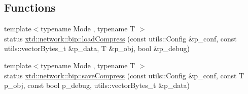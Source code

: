 \subsection*{Functions}
\begin{DoxyCompactItemize}
\item 
{\footnotesize template$<$typename Mode , typename T $>$ }\\status \hyperlink{namespacextd_1_1network_1_1bip_a48193a997dc7b1e8f5515c86ec50405c}{xtd\+::network\+::bip\+::load\+Compress} (const utils\+::\+Config \&p\+\_\+conf, const utils\+::vector\+Bytes\+\_\+t \&p\+\_\+data, T \&p\+\_\+obj, bool \&p\+\_\+debug)
\item 
{\footnotesize template$<$typename Mode , typename T $>$ }\\status \hyperlink{namespacextd_1_1network_1_1bip_a86bf6b3f22dd9b8c49cc138e4cd44921}{xtd\+::network\+::bip\+::save\+Compress} (const utils\+::\+Config \&p\+\_\+conf, const T p\+\_\+obj, const bool p\+\_\+debug, utils\+::vector\+Bytes\+\_\+t \&p\+\_\+data)
\end{DoxyCompactItemize}
